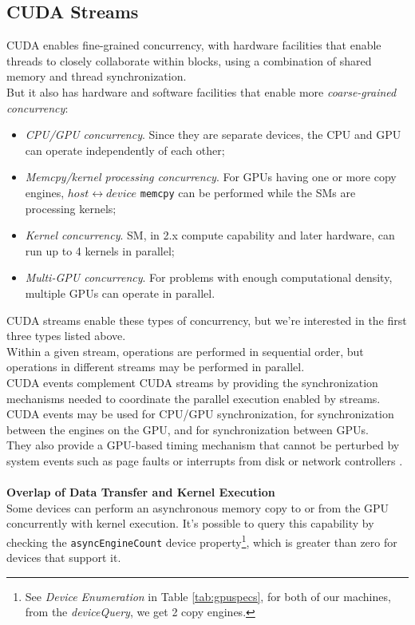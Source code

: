 \subsection{CUDA Streams}
\label{subs:streams} 
CUDA enables fine-grained concurrency, with hardware facilities that enable threads to closely collaborate within blocks, using a combination of shared memory and thread synchronization.\\
But it also has hardware and software facilities that enable more \textit{coarse-grained concurrency}\cite{cudaguide}: 
\begin{itemize}
	\item \textit{CPU/GPU concurrency}. Since they are separate devices, the CPU and GPU can operate independently of each other;
	\item \textit{Memcpy/kernel processing concurrency}. For GPUs having one or more copy engines, \(host \leftrightarrow device\) \texttt{memcpy} can be performed while the SMs are processing kernels;
	\item \textit{Kernel concurrency}. SM, in 2.x compute capability and later hardware, can run up to 4 kernels in parallel;
	\item \textit{Multi-GPU concurrency}. For problems with enough computational density, multiple GPUs can operate in parallel.
\end{itemize}
  CUDA streams enable these types of concurrency, but we're interested in the first three types listed above.\\
  Within a given stream, operations are performed in sequential order, but operations in different streams may be performed in parallel.\\
  CUDA events complement CUDA streams by providing the synchronization mechanisms needed to coordinate the parallel execution enabled by streams. CUDA events may be used for CPU/GPU synchronization, for synchronization between the engines on the GPU, and for synchronization between GPUs.\\
  They also provide a GPU-based timing mechanism that cannot be perturbed by system events such as page faults or interrupts from disk or network controllers \cite{cudahandbook,cudaguide}. \\\\
%
	\textbf{Overlap of Data Transfer and Kernel Execution}\\
	Some devices can perform an asynchronous memory copy to or from the GPU concurrently with kernel execution. 
	It's possible to query this capability by checking the \texttt{asyncEngineCount} device property\footnote{ See \textit{Device Enumeration} in Table \ref{tab:gpuspecs}, for both of our machines, from the \textit{deviceQuery}, we get 2 copy engines.}, which is greater than zero for devices that support it.
